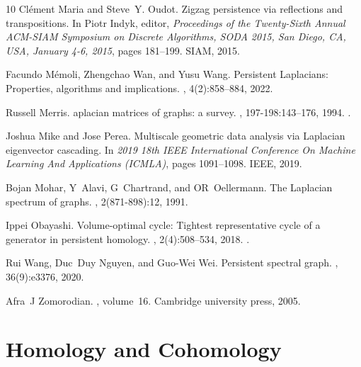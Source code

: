 \begin{thebibliography}{10}
Cl{\'{e}}ment Maria and Steve~Y. Oudot.
\newblock Zigzag persistence via reflections and transpositions.
\newblock In Piotr Indyk, editor, {\em Proceedings of the Twenty-Sixth Annual
  {ACM-SIAM} Symposium on Discrete Algorithms, {SODA} 2015, San Diego, CA, USA,
  January 4-6, 2015}, pages 181--199. {SIAM}, 2015.

Facundo M{\'e}moli, Zhengchao Wan, and Yusu Wang.
\newblock Persistent {L}aplacians: Properties, algorithms and implications.
, 4(2):858--884,
  2022.

Russell Merris.
aplacian matrices of graphs: a survey.
, 197-198:143--176, 1994.
\newblock \href {https://doi.org/10.1016/0024-3795(94)90486-3}
  {}.

Joshua Mike and Jose Perea.
\newblock Multiscale geometric data analysis via {L}aplacian eigenvector
  cascading.
\newblock In {\em 2019 18th IEEE International Conference On Machine Learning
  And Applications (ICMLA)}, pages 1091--1098. IEEE, 2019.

Bojan Mohar, Y~Alavi, G~Chartrand, and OR~Oellermann.
\newblock The {L}aplacian spectrum of graphs.
, 2(871-898):12,
  1991.

Ippei Obayashi.
\newblock Volume-optimal cycle: Tightest representative cycle of a generator in
  persistent homology.
, 2(4):508--534,
  2018.
\newblock \href {https://doi.org/10.1137/17M1159439}
  {}.

Rui Wang, Duc~Duy Nguyen, and Guo-Wei Wei.
\newblock Persistent spectral graph.
, 36(9):e3376, 2020.

Afra~J Zomorodian.
, volume~16.
\newblock Cambridge university press, 2005.

\end{thebibliography}
\appendix  
\section{Homology and Cohomology}
\label{sec:homology}

